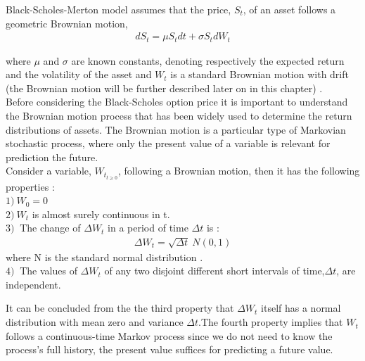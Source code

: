 \documentclass[12pt]{report}
\begin{document}
Black-Scholes-Merton model assumes that the price, $S_t$, of an asset follows a geometric Brownian motion,
\begin{gather}
dS_t = \mu S_tdt +\sigma S_tdW_t
\end{gather}

where $\mu$ and $\sigma$ are known constants, 
denoting respectively the expected return and the volatility of the asset and $W_t$ is a standard Brownian motion with drift (the Brownian motion will be further described later on in this chapter) .\\


Before considering the Black-Scholes option price it is  important to understand the Brownian motion process that has been widely used to determine  the return distributions of assets. The Brownian motion is a particular type of Markovian stochastic process, where only the present value of a variable is relevant for prediction the future.\\

Consider a variable, $W_{t_{t \geqslant 0}}$,  following a Brownian motion, then it has the following properties :\\
$1)~ W_0=0 $\\
$2)~W_t$ is almost surely  continuous in t.\\
$3)~$ The change of $\Delta W_t$ in a  period of time $\Delta t$ is : 
\begin{gather}
\Delta W_t= \sqrt{\Delta t}~ N(0,1)
\end{gather}
where N is the standard normal distribution .\\
$4)~$ The values of $\Delta W_t$ of any two disjoint different short intervals of time,$\Delta t$, are independent.\\ 

It can be concluded from the the third property that $\Delta W_t$ itself has a normal distribution with mean zero and variance $\Delta t$.The fourth property implies that $W_t$ follows a continuous-time Markov process since we do not need to know  the process's full history, the present value suffices for predicting  a future value.\\
\end{document}
